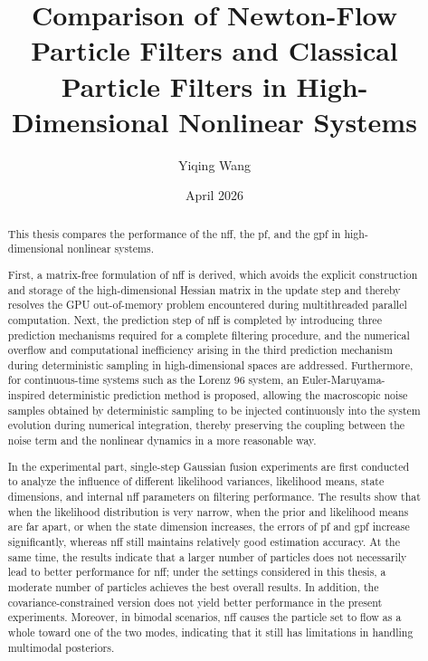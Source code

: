 \documentclass[english]{isasthesis}
\title{Comparison of Newton-Flow Particle Filters and Classical
	Particle Filters in High-Dimensional Nonlinear Systems}
\author{Yiqing Wang}
\date{April 2026}
\begin{document}
	\maketitle
	
	\begin{abstract}
		This thesis compares the performance of the \ac{nff}, the \ac{pf}, and the \ac{gpf} in high-dimensional nonlinear systems.
		
		First, a matrix-free formulation of \ac{nff} is derived, which avoids the explicit construction and storage of the high-dimensional Hessian matrix in the update step and thereby resolves the GPU out-of-memory problem encountered during multithreaded parallel computation. Next, the prediction step of \ac{nff} is completed by introducing three prediction mechanisms required for a complete filtering procedure, and the numerical overflow and computational inefficiency arising in the third prediction mechanism during deterministic sampling in high-dimensional spaces are addressed. Furthermore, for continuous-time systems such as the Lorenz 96 system, an Euler-Maruyama-inspired deterministic prediction method is proposed, allowing the macroscopic noise samples obtained by deterministic sampling to be injected continuously into the system evolution during numerical integration, thereby preserving the coupling between the noise term and the nonlinear dynamics in a more reasonable way.
		
		In the experimental part, single-step Gaussian fusion experiments are first conducted to analyze the influence of different likelihood variances, likelihood means, state dimensions, and internal \ac{nff} parameters on filtering performance. The results show that when the likelihood distribution is very narrow, when the prior and likelihood means are far apart, or when the state dimension increases, the errors of \ac{pf} and \ac{gpf} increase significantly, whereas \ac{nff} still maintains relatively good estimation accuracy. At the same time, the results indicate that a larger number of particles does not necessarily lead to better performance for \ac{nff}; under the settings considered in this thesis, a moderate number of particles achieves the best overall results. In addition, the covariance-constrained version does not yield better performance in the present experiments. Moreover, in bimodal scenarios, \ac{nff} causes the particle set to flow as a whole toward one of the two modes, indicating that it still has limitations in handling multimodal posteriors.
		

\end{abstract}
\end{document}
